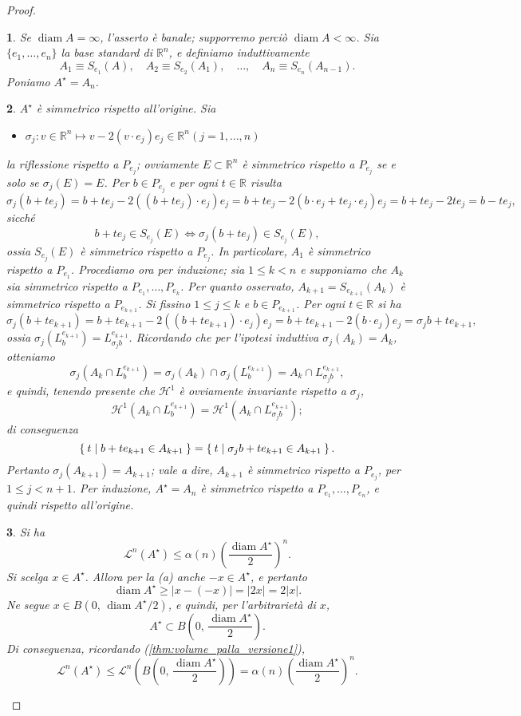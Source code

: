 \documentclass[a4paper,10pt,openright,oneside]{book}
\theoremstyle{theoremstyle}
\theoremstyle{theoremstylewoheader}
\theoremstyle{theoremstyle}
\theoremstyle{proofsecstyle}
\newtheorem{proofsec}{}
\theoremstyle{nonumberplain}
\newtheorem{proof}{Dim.}
\newcommand{\RR}{\ensuremath{\mathbb{R}}}
\newcommand{\Leb}{\ensuremath{\mathcal{L}}}
\newcommand{\Haus}{\ensuremath{\mathcal{H}}}
\newcommand{\abs}[1]{\ensuremath{\lvert #1 \rvert}}
\DeclareMathOperator{\diam}{diam}
\newcommand{\mymath}[2]{\begin{itemize}%
  \item[]\hfill\hbox{}\ensuremath{\displaystyle #1}\hfill\ensuremath{\displaystyle #2}%
  \end{itemize}}
\begin{document}
\begin{proof}
\begin{proofsec}
Se $\diam A = \infty$, l'asserto è banale; supporremo perciò $\diam A < \infty$. Sia $\{e_1, \ldots, e_n\}$ la base standard di $\RR^n$, e definiamo induttivamente
\[
A_1 \equiv S_{e_1}(A),\quad A_2 \equiv S_{e_2}(A_1),\quad \ldots,\quad A_n \equiv S_{e_n}(A_{n-1}).
\]
Poniamo $A^\star = A_n$.
\end{proofsec}
 
\begin{proofsec}
\emph{$A^\star$ è simmetrico rispetto all'origine.}\hspace{.5em} Sia \mymath{\sigma_j : v \in \RR^n \mapsto v - 2(v \cdot e_j)e_j \in \RR^n}{(j = 1, \ldots, n)} la \emph{riflessione} rispetto a $P_{e_j}$; ovviamente $E \subset \RR^n$ è simmetrico rispetto a $P_{e_j}$ se e solo se $\sigma_j(E) = E$. Per $b \in P_{e_j}$ e per ogni $t \in \RR$ risulta
\[
\sigma_j(b+te_j) = b + te_j - 2((b+te_j) \cdot e_j)e_j = b + te_j - 2(b \cdot e_j + te_j \cdot e_j)e_j = b + te_j - 2te_j = b - te_j,
\]
sicché
\[
b + te_j \in S_{e_j}(E) \iff \sigma_j(b + te_j) \in S_{e_j}(E),
\]
ossia $S_{e_j}(E)$ è simmetrico rispetto a $P_{e_j}$. In particolare, $A_1$ è simmetrico rispetto a $P_{e_1}$. Procediamo ora per induzione; sia $1 \le k < n$ e supponiamo che $A_k$ sia simmetrico rispetto a $P_{e_1}, \ldots, P_{e_k}$. Per quanto osservato, $A_{k+1} = S_{e_{k+1}} (A_k)$ è simmetrico rispetto a $P_{e_{k+1}}$. Si fissino $1 \le j \le k$ e $b \in P_{e_{k+1}}$. Per ogni $t \in \RR$ si ha
\[
\sigma_j(b+te_{k+1}) = b + te_{k+1} - 2((b+te_{k+1}) \cdot e_j) e_j = b + te_{k+1} - 2(b \cdot e_j)e_j = \sigma_jb + te_{k+1},
\]
ossia $\sigma_j(L_b^{e_{k+1}}) = L_{\sigma_jb}^{e_{k+1}}$. Ricordando che per l'ipotesi induttiva $\sigma_j(A_k) = A_k$, otteniamo
\[
\sigma_j(A_k \cap L_b^{e_{k+1}}) = \sigma_j(A_k) \cap \sigma_j(L_b^{e_{k+1}}) = A_k \cap L_{\sigma_jb}^{e_{k+1}},
\]
e quindi, tenendo presente che $\Haus^1$ è ovviamente invariante rispetto a $\sigma_j$,
\[
\Haus^1(A_k \cap L_b^{e_{k+1}}) = \Haus^1(A_k \cap L_{\sigma_jb}^{e_{k+1}});
\]
di conseguenza
\[
\Set{ t | b + te_{k+1} \in A_{k+1} } = \Set{ t | \sigma_j b + te_{k+1} \in A_{k+1} }.
\]
Pertanto $\sigma_j(A_{k+1}) = A_{k+1}$; vale a dire, $A_{k+1}$ è simmetrico rispetto a $P_{e_j}$, per $1 \le j < n+1$. Per induzione, $A^\star = A_n$ è simmetrico rispetto a $P_{e_1}, \ldots, P_{e_n}$, e quindi rispetto all'origine.
\end{proofsec}

\begin{proofsec}
\emph{Si ha}
\[
\Leb^n(A^\star) \le \alpha(n) \left(\frac{\diam A^\star}{2}\right)^n.
\]
Si scelga $x \in A^\star$. Allora per la (a) anche $-x \in A^\star$, e pertanto
\[
\diam A^\star \ge \abs{x - (-x)} = \abs{2x} = 2\abs{x}.
\]
Ne segue $x \in B(0,\, \diam A^\star/2)$, e quindi, per l'arbitrarietà di $x$,
\[
A^\star \subset B\left(0,\, \frac{\diam A^\star}{2}\right).
\]
Di conseguenza, ricordando (\ref{thm:volume_palla_versione1}),
\[
\Leb^n(A^\star) \le \Leb^n \left(B\left(0,\, \frac{\diam A^\star}{2}\right)\right) = \alpha(n)\left(\frac{\diam A^\star}{2}\right)^n.
\]
\end{proofsec}


\end{proof}
\end{document}
